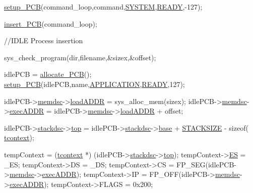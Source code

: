 \begin{DoxyCode}
        \hyperlink{mpx__r2_8c_a316c9619aba53c03c17afbc0a0dbf096}{setup_PCB}(command\_loop,command,\hyperlink{mpx__r2_8h_a21b97df85e65556468b28a576311271c}{SYSTEM},\hyperlink{mpx__r2_8h_ad1235d5ce36f7267285e82dccd428aa6}{READY},-127);

        \hyperlink{mpx__r2_8c_aa3b334e3a5afd6e590917667ad359a6f}{insert_PCB}(command\_loop);

        \textcolor{comment}{//IDLE Process insertion}

        sys\_check\_program(dir,filename,&sizex,&offset);

        idlePCB = \hyperlink{mpx__r2_8c_a58a8a1ea0a96b9ecf0be29179a5a0a1e}{allocate_PCB}();
        \hyperlink{mpx__r2_8c_a316c9619aba53c03c17afbc0a0dbf096}{setup_PCB}(idlePCB,name,\hyperlink{mpx__r2_8h_a796bd7c6ba2e59281760fb155c6287e8}{APPLICATION},\hyperlink{mpx__r2_8h_ad1235d5ce36f7267285e82dccd428aa6}{READY},127);

        idlePCB->\hyperlink{structprocess_a163551ab7b60184b48e5d440fcd5c2b8}{memdsc}->\hyperlink{structmem_a8f5a4db03ee0560e6bd4dd602ad753c0}{loadADDR} = sys\_alloc\_mem(sizex);
        idlePCB->\hyperlink{structprocess_a163551ab7b60184b48e5d440fcd5c2b8}{memdsc}->\hyperlink{structmem_a5340491e17307817e6dca3b1d260d18a}{execADDR} = idlePCB->\hyperlink{structprocess_a163551ab7b60184b48e5d440fcd5c2b8}{memdsc}->\hyperlink{structmem_a8f5a4db03ee0560e6bd4dd602ad753c0}{loadADDR} + offset;

        idlePCB->\hyperlink{structprocess_a7e0fb37fbb9c155b18f75a94a8fc202b}{stackdsc}->\hyperlink{structstack_adf145fa22a24464ff19409e2618a583d}{top} = idlePCB->\hyperlink{structprocess_a7e0fb37fbb9c155b18f75a94a8fc202b}{stackdsc}->\hyperlink{structstack_a1cdb71e486a79747d482aa46f6b10290}{base} + \hyperlink{mpx__r2_8h_a21d9543c516fffee84a7963224271f95}{STACKSIZE} - \textcolor{keyword}{sizeof}(
      \hyperlink{structcontext}{tcontext});

        tempContext = (\hyperlink{structcontext}{tcontext} *) (idlePCB->\hyperlink{structprocess_a7e0fb37fbb9c155b18f75a94a8fc202b}{stackdsc}->\hyperlink{structstack_adf145fa22a24464ff19409e2618a583d}{top});
        tempContext->\hyperlink{structcontext_a81a78fef7bda3a5dd852b28a905890ab}{ES} = \_ES;
        tempContext->DS = \_DS;
        tempContext->CS = FP\_SEG(idlePCB->\hyperlink{structprocess_a163551ab7b60184b48e5d440fcd5c2b8}{memdsc}->\hyperlink{structmem_a5340491e17307817e6dca3b1d260d18a}{execADDR});
        tempContext->IP = FP\_OFF(idlePCB->\hyperlink{structprocess_a163551ab7b60184b48e5d440fcd5c2b8}{memdsc}->\hyperlink{structmem_a5340491e17307817e6dca3b1d260d18a}{execADDR});
        tempContext->FLAGS = 0x200;


\end{DoxyCode}
